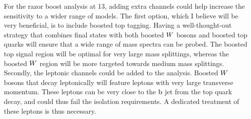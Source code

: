 For the razor boost analysis at 13\TeV, adding extra channels could help increase the sensitivity
to a wider range of models. The first option, which I believe will be very beneficial, is to include
boosted top tagging. Having a well-thought-out strategy that combines final states with both boosted
$W$ bosons and boosted top quarks will ensure that a wide range of mass spectra can be probed. The
boosted top signal region will be optimal for very large mass splittings, whereas the boosted $W$
region will be more targeted towards medium mass splittings. 
Secondly, the leptonic channels could be added to the analysis. Boosted $W$ bosons that decay
leptonically will feature leptons with very large transverse momentum. These leptons can be very
close to the $\mathrm{b}$ jet from the top quark decay, and could thus fail the isolation requirements.
A dedicated treatment of these leptons is thus necessary. 

















